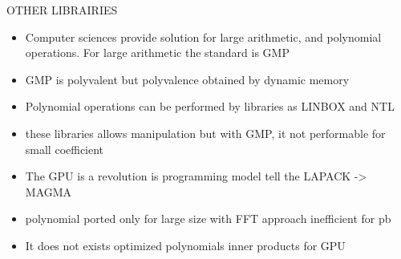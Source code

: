 \documentclass[oribibl]{llncs2e/llncs}
\begin{document}
OTHER LIBRAIRIES


\begin{itemize}
\item Computer sciences provide solution for large arithmetic, and polynomial operations. For large arithmetic the standard is GMP
\item  GMP is polyvalent but polyvalence obtained by dynamic memory 
\item Polynomial operations can be performed by libraries as LINBOX and NTL
\item these libraries allows manipulation but with GMP, it not performable for small coefficient
\item  The GPU is a revolution is programming model tell the LAPACK -> MAGMA 
\item polynomial ported only for large size with FFT approach inefficient for pb 
\item It does not exists optimized polynomials inner products for GPU
\end{itemize}



\end{document}
